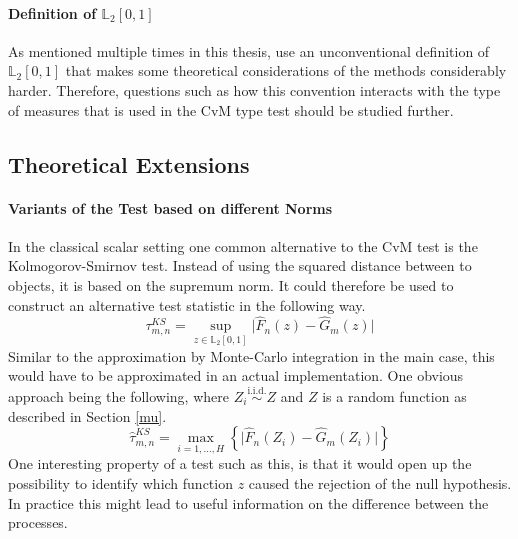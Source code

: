 \documentclass[12pt, a4paper]{article}
\theoremstyle{MAstyle} \newtheorem{assumption}{Assumption}[section]
\theoremstyle{MAstyle} \newtheorem{definition}{Definition}[section]
\theoremstyle{MAstyle} \newtheorem{theorem}{Theorem}[section]
\begin{document}
			\paragraph{Definition of $\mathbb{L}_2[0,1]$ \\}
				As mentioned multiple times in this thesis, \cite{bugni_permutation_2021} use an unconventional definition of $\mathbb{L}_2[0,1]$ that makes some theoretical considerations of the methods considerably harder. Therefore, questions such as how this convention interacts with the type of measures that is used in the CvM type test should be studied further. 
				
	
		\subsection{Theoretical Extensions}
			\paragraph{Variants of the Test based on different Norms\\}
			In the classical scalar setting one common alternative to the CvM test is the Kolmogorov-Smirnov test. Instead of using the squared distance between to objects, it is based on the supremum norm. It could therefore be used to construct an alternative test statistic in the following way. 
			\begin{equation}
				\tau^{\textit{KS}}_{m,n} = \sup_{z \in \mathbb{L}_2[0,1]} \vert \hat{F}_n(z) - \hat{G}_m(z) \vert
			\end{equation}
			Similar to the approximation by Monte-Carlo integration in the main case, this would have to be approximated in an actual implementation. One obvious approach being the following, where $Z_i \stackrel{\text{i.i.d.}}{\sim} Z$ and $Z$ is a random function as described in Section \ref{mu}.
			\begin{equation}
				\hat{\tau}^{\textit{KS}}_{m,n} = \max_{i = 1, \dots, H}\left\{\vert \hat{F}_n(Z_i) - \hat{G}_m(Z_i) \vert \right\}
			\end{equation}
			One interesting property of a test such as this, is that it would open up the possibility to identify which function $z$ caused the rejection of the null hypothesis. In practice this might lead to useful information on the difference between the processes.
			
\end{document}
